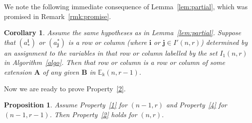 \documentclass[10pt]{article}
\newtheorem{prop}[theorem]{Proposition}
\newtheorem{coro}[theorem]{Corollary}
\theoremstyle{definition}
\newcommand{\E}{\mathbb{E}}
\newcommand{\bi}{{\boldsymbol{i}}} %
\newcommand{\bj}{{\boldsymbol{j}}}
\newcommand{\bA}{\mathbf{A}}
\newcommand{\bB}{\mathbf{B}}
\begin{document}
We note the following immediate consequence of Lemma~\ref{lem:partial}, which was promised in Remark~\ref{rmk:promise}.

\begin{coro}\label{cor:colouring}
Assume the same hypotheses as in Lemma~\ref{lem:partial}. Suppose that
$(a^\bi_*)$ or $(a^*_\bj)$ is a row or column \textup{(}where $\bi$ or
$\bj \in I'(n,r)$\textup{)} determined by an assignment to the
variables in that row or column labelled by the set $I_1(n,r)$ in
Algorithm~\ref{algo}. Then that row or column is a row or column of
some extension $\bA$ of any given $\bB$ in $\E_\Bbbk(n,r-1)$.
\end{coro}

Now we are ready to prove Property~\ref{2}. 

\begin{prop}\label{prop:decomp}
Assume Property~\ref{1} for $(n-1,r)$ and Property~\ref{4} for
$(n-1,r-1)$. Then Property~\ref{2} holds for $(n,r)$.
\end{prop}
\end{document}
